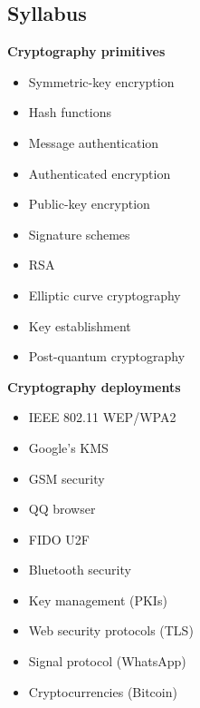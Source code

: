 \subsection*{Syllabus}
\begin{minipage}{0.45\textwidth}
    \textbf{Cryptography primitives}
    \begin{itemize}
        \item Symmetric-key encryption
        \item Hash functions
        \item Message authentication
        \item Authenticated encryption
        \item Public-key encryption
        \item Signature schemes
        \item RSA
        \item Elliptic curve cryptography
        \item Key establishment
        \item Post-quantum cryptography
    \end{itemize}
\end{minipage}
\begin{minipage}{0.45\textwidth}
    \textbf{Cryptography deployments}
    \begin{itemize}
        \item IEEE 802.11 WEP/WPA2
        \item Google's KMS
        \item GSM security
        \item QQ browser
        \item FIDO U2F
        \item Bluetooth security
        \item Key management (PKIs)
        \item Web security protocols (TLS)
        \item Signal protocol (WhatsApp)
        \item Cryptocurrencies (Bitcoin)
    \end{itemize}
\end{minipage}
